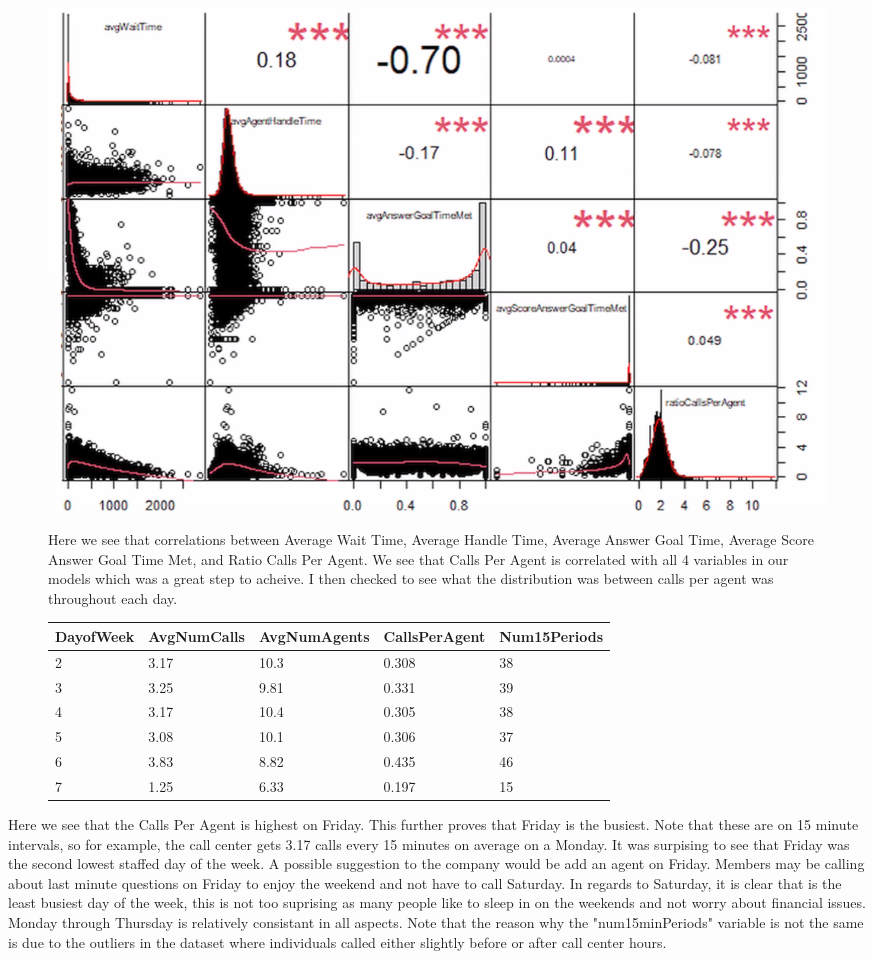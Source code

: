 \documentclass[12pt]{article}
\begin{document}
\begin{figure}[H]
  \centering
  \includegraphics[width=\textwidth]{Correlation.png}
  \caption{Correlation Between Variables.}
  \label{fig:Correlation}

Here we see that correlations between Average Wait Time, Average Handle Time, Average Answer Goal Time, Average Score Answer Goal Time Met, and Ratio Calls Per Agent.
We see that Calls Per Agent is correlated with all 4 variables in our models which was a great step to acheive. I then checked to see what the distribution was between calls per agent was throughout each day. 
  \begin{table}[H]
    \resizebox{\textwidth}{!} {
    \begin{tabular}{ l | l | l | l | l |}
      {\bf DayofWeek} & {\bf AvgNumCalls} & {\bf AvgNumAgents} & {\bf CallsPerAgent} & {\bf Num15Periods} \\
    \hline
    2 & 3.17 & 10.3 & 0.308 & 38 \\
    \hline
    3 & 3.25 & 9.81 & 0.331 & 39 \\
    \hline
    4 & 3.17 & 10.4 & 0.305 & 38 \\
    \hline
    5 & 3.08 & 10.1 & 0.306 & 37 \\
    \hline
    6 & 3.83 & 8.82 & 0.435 & 46 \\
    \hline
    7 & 1.25 & 6.33  & 0.197 & 15 \\
    \end{tabular}
    }
    \end{table}
\end{figure}
Here we see that the Calls Per Agent is highest on Friday. This further proves that Friday is the busiest. Note that these are on 15 minute intervals,
so for example, the call center gets 3.17 calls every 15 minutes on average on a Monday. It was surpising to see that Friday was the second
lowest staffed day of the week. A possible suggestion to the company would be add an agent on Friday. Members may be calling about last minute
questions on Friday to enjoy the weekend and not have to call Saturday. In regards to Saturday, it is clear that is the least busiest day of the week,
this is not too suprising as many people like to sleep in on the weekends and not worry about financial issues. Monday through Thursday is relatively
consistant in all aspects. Note that the reason why the "num15minPeriods" variable is not the same is due to the outliers in the dataset where individuals
called either slightly before or after call center hours.
\end{document}
